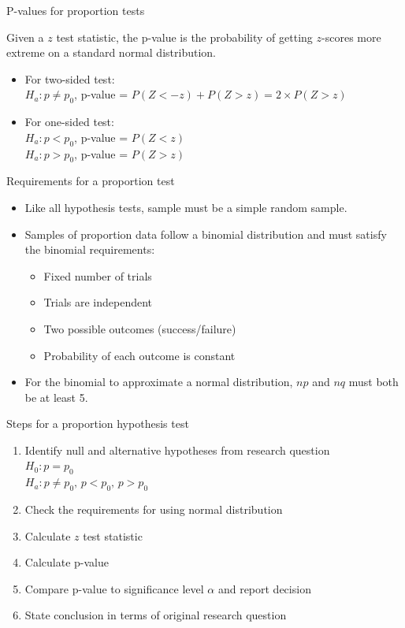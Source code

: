 \documentclass[xcolor=table]{beamer}
\begin{document}
\begin{frame}{P-values for proportion tests}
\begin{block}{}
\large
Given a $z$ test statistic, the p-value is the probability of getting $z$-scores more extreme on a standard normal distribution.
\begin{itemize}
\pause\item For two-sided test:\\ 
$H_a: p \ne p_0$, p-value = $P(Z<-z) + P(Z > z) = 2 \times P(Z > z)$
\pause\item For one-sided test:\\
$H_a: p < p_0$, p-value = $P(Z < z)$\\
$H_a: p > p_0$, p-value = $P(Z > z)$
\end{itemize}
\end{block}
\end{frame}

\begin{frame}{Requirements for a proportion test}
\begin{block}{}
\large
\begin{itemize}
\item Like all hypothesis tests, sample must be a simple random sample.\\
\item Samples of proportion data follow a binomial distribution and must satisfy the binomial requirements:
\begin{itemize}
\item Fixed number of trials
\item Trials are independent
\item Two possible outcomes (success/failure)
\item Probability of each outcome is constant
\end{itemize}
\item For the binomial to approximate a normal distribution, $np$ and $nq$ must both be at least 5.
\end{itemize}
\end{block}
\end{frame}

\begin{frame}{Steps for a proportion hypothesis test}
\begin{block}{}
\large
\begin{enumerate}
\item Identify null and alternative hypotheses from research question\\
$H_0: p = p_0$\\
$H_a: p \ne p_0, \, p < p_0, \, p> p_0$
\item Check the requirements for using normal distribution
\item Calculate $z$ test statistic
\item Calculate p-value
\item Compare p-value to significance level $\alpha$ and report decision
\item State conclusion in terms of original research question
\end{enumerate}
\end{block}
\end{frame}
\end{document}
